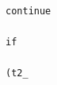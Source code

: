 \documentclass[10pt,a4paper]{article} %
\begin{document}
\begin{lstlisting}
                                                                                                                                                                                                                                                                                                                                                                                                                                                                                                                                                                                                                                                                                                                                                                                                                                                                                                                                                                                                                                                    continue
                                                                                                                                                                                                                                                                                                                                                                                                                                                                                                                                                                                                                                                                                                                                                                                                                                                                                                                                                                                                                                                                    if
                                                                                                                                                                                                                                                                                                                                                                                                                                                                                                                                                                                                                                                                                                                                                                                                                                                                                                                                                                                                                                                                        (t2_

\end{lstlisting}
\end{document}
